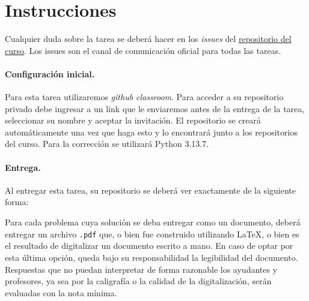 
\section*{Instrucciones}

Cualquier duda sobre la tarea se deberá hacer en los \emph{issues} del \href{https://github.com/IIC3253/2026}{repositorio del curso}. Los issues son el canal de comunicación oficial para todas las tareas.

\paragraph{Configuración inicial.}
Para esta tarea utilizaremos \textit{github classroom}.
Para acceder a su repositorio privado debe ingresar a un link que le enviaremos antes de la entrega de la tarea, seleccionar su nombre y aceptar la invitación.
El repositorio se creará automáticamente una vez que haga esto y lo encontrará junto a los repositorios del curso.
Para la corrección se utilizará Python 3.13.7.

\paragraph{Entrega.} Al entregar esta tarea, su repositorio se deberá ver exactamente de la siguiente forma:

\bigskip


\bigskip

Para cada problema cuya solución se deba entregar como un documento, deberá entregar un archivo \texttt{.pdf} que, o bien fue construido utilizando \LaTeX, o bien es el resultado de digitalizar un documento escrito a mano. En caso de optar por esta última opción, queda bajo su responsabilidad la legibilidad del documento. Respuestas que no puedan interpretar de forma razonable los ayudantes y profesores, ya sea por la caligrafía o la calidad de la digitalización, serán evaluadas con la nota mínima.
